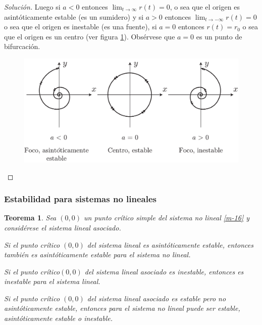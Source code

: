 \documentclass[a5paper,doc,10pt,noapacite]{apa6}
\newtheorem{teorema}{Teorema}
\begin{document}
{{\begin{proof}[Solución]
		Luego si \(a<0\) entonces \(\lim_{t\to\infty}r(t)=0\), o sea que el origen es asintóticamente estable (es un sumidero) y si  \(a>0\) entonces \(\lim_{t\to-\infty}r(t)=0\) o sea que el origen es inestable (es una fuente), si \(a=0\) entonces \(r(t)=r_0\) o sea que el origen es un centro (ver figura \ref{fig:M-20}). Obsérvese que \(a=0\) es un punto de bifurcación.	\qedhere
		\vspace{-1\baselineskip}
	\begin{figure}[H]
		\captionsetup{justification=centering, labelfont=footnotesize, font=footnotesize}
		\centering
		\includegraphics[scale=0.35]{Graficos/figura20}
	
		\caption{ }
		\label{fig:M-20}
	\end{figure}
	\end{proof}


%
\subsubsection{Estabilidad para sistemas no lineales}

\begin{teorema}\label{teo-7}
	Sea \((0,0)\) un punto crítico simple del sistema no lineal \eqref{m-16} y considérese el sistema lineal
	asociado.
	\begin{APAenumerate}
		\item Si el punto crítico \((0,0)\) del sistema lineal es asintóticamente estable, entonces también es asintóticamente estable para el sistema no lineal.
		\item Si el punto crítico\((0,0)\) del sistema lineal asociado es inestable, entonces es inestable para el sistema lineal.
		\item Si el punto crítico \((0,0)\) del sistema lineal asociado es estable pero no asintóticamente estable, entonces para el sistema no lineal puede ser estable, asintóticamente estable o inestable.
	\end{APAenumerate}
\end{teorema}

}}
\end{document}

